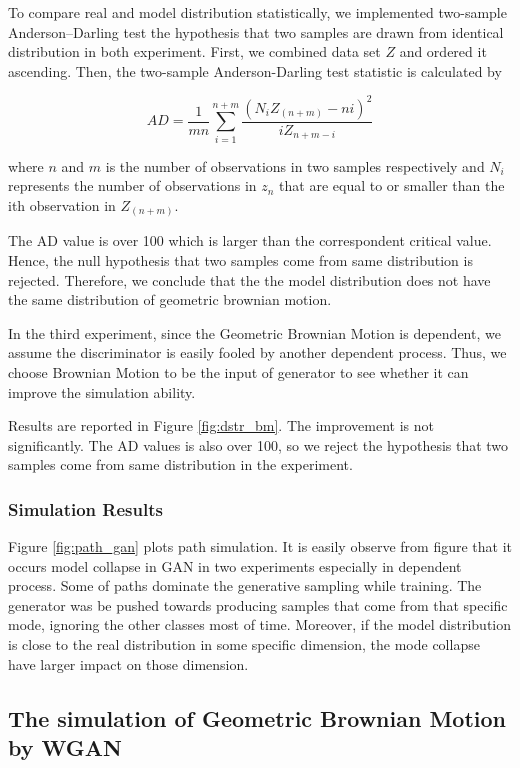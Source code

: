 \documentclass{article}
\begin{document}
	To compare real and model distribution statistically, we implemented two-sample Anderson–Darling test the hypothesis that two samples are drawn from identical distribution in both experiment.
	First, we combined data set $Z$ and ordered it ascending.
	Then, the two-sample Anderson-Darling test statistic is calculated by
	
	\begin{equation}
	AD = \frac{1}{mn}\sum_{i=1}^{n+m}\frac{(N_iZ_{(n+m)}-ni)^2}{iZ_{n+m-i}}
	\end{equation}
	
	where $n$ and $m$ is the number of observations in two samples respectively and $N_i$ represents the number of observations in $z_n$ that are equal to or smaller
	than the ith observation in $Z_{(n+m)}$. 
	
	The AD value is over 100 which is larger than the correspondent critical value.  
	Hence, the null hypothesis that two samples come from same distribution is rejected. 
	Therefore, we conclude that the the model distribution does not have the same distribution of geometric brownian motion.
	
	In the third experiment, 
	since the Geometric Brownian Motion is dependent, we assume the discriminator is easily fooled by another dependent process.
	Thus, we choose Brownian Motion to be the input of generator to see whether it can improve the simulation ability.

	Results are reported in Figure \ref{fig:dstr_bm}. 
	The improvement is not significantly.
	The AD values is also over 100, so we reject the hypothesis that two samples come from same distribution in the experiment. 
	
	\subsubsection{Simulation Results}
	
	Figure \ref{fig:path_gan} plots path simulation.
	It is easily observe from figure that it occurs model collapse in GAN in two experiments especially in dependent process. 
	Some of paths dominate the generative sampling while training.
	The generator was be pushed towards producing samples that come from that specific mode, ignoring the other classes most of time. 
	Moreover, if the model distribution is close to the real distribution in some specific dimension, the mode collapse have larger impact on those dimension.
	

	\subsection{The simulation of Geometric Brownian Motion by WGAN}
	
\end{document}
